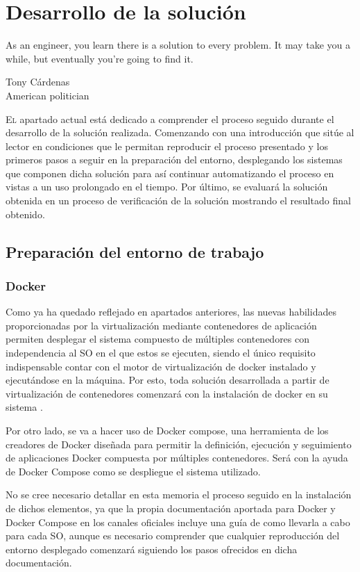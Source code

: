 \chapter{Desarrollo de la solución}\label{chp-04}
\epigraph{As an engineer, you learn there is a solution to every problem. It may take you a while, but eventually you're going to find it.}{Tony Cárdenas\\American politician}

\lettrine[lraise=-0.1, lines=2, loversize=0.2]{E}{l} apartado actual está dedicado a comprender el proceso seguido durante el desarrollo de la solución realizada. Comenzando con una introducción que sitúe al lector en condiciones que le permitan reproducir el proceso presentado y los primeros pasos a seguir en la preparación del entorno, desplegando los sistemas que componen dicha solución para así continuar automatizando el proceso en vistas a un uso prolongado en el tiempo. Por último, se evaluará la solución obtenida en un proceso de verificación de la solución mostrando el resultado final obtenido.

\section{Preparación del entorno de trabajo}\label{preparacion}

\subsection{Docker}
Como ya ha quedado reflejado en apartados anteriores, las nuevas habilidades proporcionadas por la virtualización mediante contenedores de aplicación permiten desplegar el sistema compuesto de múltiples contenedores con independencia al \gls{SO} en el que estos se ejecuten, siendo el único requisito indispensable contar con el motor de virtualización de docker instalado y ejecutándose en la máquina. Por esto, toda solución desarrollada a partir de virtualización de contenedores comenzará con la instalación de docker en su sistema .

Por otro lado, se va a hacer uso de Docker compose, una herramienta de los creadores de Docker diseñada para permitir la definición, ejecución y seguimiento de aplicaciones Docker compuesta por múltiples contenedores. Será con la ayuda de Docker Compose como se despliegue el sistema utilizado.

No se cree necesario detallar en esta memoria el proceso seguido en la instalación de dichos elementos, ya que la propia documentación aportada para Docker\cite{dockerinstallation2017} y Docker Compose\cite{dockercomposeinstallation2017} en los canales oficiales incluye una guía de como llevarla a cabo para cada \gls{SO}, aunque es necesario comprender que cualquier reproducción del entorno desplegado comenzará siguiendo los pasos ofrecidos en dicha documentación.

